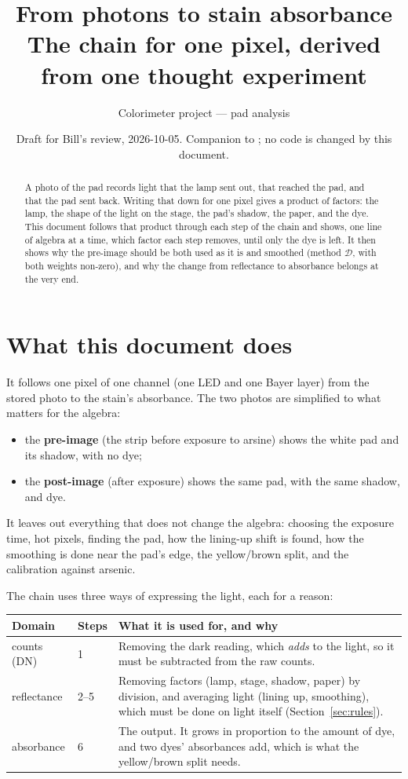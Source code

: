 \documentclass[11pt,letter]{article}
\title{From photons to stain absorbance\\
\large The chain for one pixel, derived from one thought experiment}
\author{Colorimeter project --- pad analysis}
\date{Draft for Bill's review, 2026-10-05.  Companion to
\file{analysis\_chain.tex}; no code is changed by this document.}
\newcommand{\MD}{\mathcal{D}}
\begin{document}
\maketitle

\begin{abstract}
\noindent
A photo of the pad records light that the lamp sent out, that reached the
pad, and that the pad sent back.  Writing that down for one pixel gives a
product of factors: the lamp, the shape of the light on the stage, the
pad's shadow, the paper, and the dye.  This document follows that product
through each step of the chain and shows, one line of algebra at a time,
which factor each step removes, until only the dye is left.  It then shows
why the pre-image should be both used as it is and smoothed (method
$\MD$, with both weights non-zero), and why the change from reflectance to
absorbance belongs at the very end.
\end{abstract}

\tableofcontents

\section{What this document does}
\label{sec:scope}

It follows one pixel of one channel (one LED and one Bayer layer) from the
stored photo to the stain's absorbance.  The two photos are simplified to
what matters for the algebra:
\begin{itemize}[nosep]
  \item the \textbf{pre-image} (the strip before exposure to arsine) shows
    the white pad and its shadow, with no dye;
  \item the \textbf{post-image} (after exposure) shows the same pad, with
    the same shadow, and dye.
\end{itemize}
It leaves out everything that does not change the algebra: choosing the
exposure time, hot pixels, finding the pad, how the lining-up shift is
found, how the smoothing is done near the pad's edge, the yellow/brown
split, and the calibration against arsenic.

\medskip
\noindent The chain uses three ways of expressing the light, each for a
reason:

\medskip
\begin{tabular}{@{}L{2.6cm}L{2.0cm}L{10.0cm}@{}}
\toprule
Domain & Steps & What it is used for, and why \\
\midrule
counts (DN) & 1 & Removing the dark reading, which \emph{adds} to the
  light, so it must be subtracted from the raw counts. \\
reflectance & 2--5 & Removing factors (lamp, stage, shadow, paper) by
  division, and averaging light (lining up, smoothing), which must be done
  on light itself (Section~\ref{sec:rules}). \\
absorbance & 6 & The output.  It grows in proportion to the amount of dye,
  and two dyes' absorbances add, which is what the yellow/brown split
  needs. \\
\bottomrule
\end{tabular}
\end{document}
